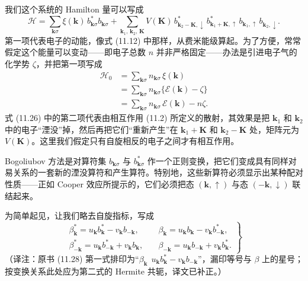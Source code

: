 我们这个系统的 Hamilton 量可以写成
\begin{equation*}
\mathcal{H}=\sum_{\mathbf{k}\sigma}\xi(\mathbf{k})\,b^{*}_{\mathbf{k}\sigma}b_{\mathbf{k}\sigma}+\sum_{\mathbf{k}_1,\,\mathbf{k}_2,\,\mathbf{K}}V(\mathbf{K})\,b^{*}_{\mathbf{k}_2-\mathbf{K},\downarrow}\,b^{*}_{\mathbf{k}_1+\mathbf{K},\uparrow}\,b_{\mathbf{k}_1,\uparrow}\,b_{\mathbf{k}_2,\downarrow}.
\tag{11.26}
\end{equation*}
第一项代表电子的动能，像式 (11.12) 中那样，从费米能级算起。为了方便，常常假定这个能量可以变动——即电子总数 $n$ 并非严格固定——办法是引进电子气的化学势 $\zeta$，并把第一项写成
\begin{align*}
\mathcal{H}_{0}&=\sum_{\mathbf{k}\sigma}n_{\mathbf{k}\sigma}\,\xi(\mathbf{k})\\
&=\sum_{\mathbf{k}\sigma}n_{\mathbf{k}\sigma}\{\mathcal{E}(\mathbf{k})-\zeta\}\\
&=\sum_{\mathbf{k}\sigma}n_{\mathbf{k}\sigma}\,\mathcal{E}(\mathbf{k})-n\zeta.
\tag{11.27}
\end{align*}
式 (11.26) 中的第二项代表由相互作用 (11.2) 所定义的散射，其效果是把 $\mathbf{k}_1$ 和 $\mathbf{k}_2$ 中的电子“湮没”掉，然后再把它们“重新产生”在 $\mathbf{k}_1+\mathbf{K}$ 和 $\mathbf{k}_2-\mathbf{K}$ 处，矩阵元为 $V(\mathbf{K})$。这里我们假定只有自旋相反的电子之间才有相互作用。

Bogoliubov 方法是对算符集 $b_{\mathbf{k}\sigma}$ 与 $b^{*}_{\mathbf{k}\sigma}$ 作一个正则变换，把它们变成具有同样对易关系的一套新的湮没算符和产生算符。特别地，这些新算符必须显示出某种配对性质——正如 Cooper 效应所提示的，它们必须把态 $(\mathbf{k},\uparrow)$ 与态 $(-\mathbf{k},\downarrow)$ 联结起来。

为简单起见，让我们略去自旋指标，写成
\begin{equation*}
\left.\begin{array}{ll}
\beta^{*}_{\mathbf{k}}=u_{\mathbf{k}}b^{*}_{\mathbf{k}}-v_{\mathbf{k}}b_{-\mathbf{k}}, &\quad \beta_{\mathbf{k}}=u_{\mathbf{k}}b_{\mathbf{k}}-v_{\mathbf{k}}b^{*}_{-\mathbf{k}},\\
\beta^{*}_{-\mathbf{k}}=u_{\mathbf{k}}b^{*}_{-\mathbf{k}}+v_{\mathbf{k}}b_{\mathbf{k}}, &\quad \beta_{-\mathbf{k}}=u_{\mathbf{k}}b_{-\mathbf{k}}+v_{\mathbf{k}}b^{*}_{\mathbf{k}}.
\end{array}\right\}
\tag{11.28}
\end{equation*}
（译注：原书 (11.28) 第一式排印为“$\beta_{\mathbf{k}}\ \ u_{\mathbf{k}}b^{*}_{\mathbf{k}}-v_{\mathbf{k}}b_{-\mathbf{k}}$”，漏印等号与 $\beta$ 上的星号；按变换关系此处应为第二式的 Hermite 共轭，译文已补正。）

